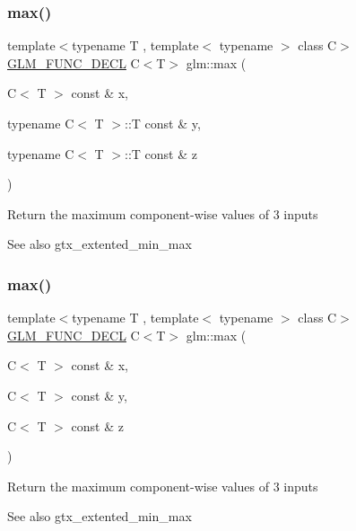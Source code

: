 \subsubsection{\texorpdfstring{max()}{max()}\hspace{0.1cm}{\footnotesize\ttfamily [2/6]}}
{\footnotesize\ttfamily template$<$typename T , template$<$ typename $>$ class C$>$ \\
\hyperlink{setup_8hpp_ab2d052de21a70539923e9bcbf6e83a51}{G\+L\+M\+\_\+\+F\+U\+N\+C\+\_\+\+D\+E\+CL} C$<$T$>$ glm\+::max (\begin{DoxyParamCaption}\item[{C$<$ T $>$ const \&}]{x,  }\item[{typename C$<$ T $>$\+::T const \&}]{y,  }\item[{typename C$<$ T $>$\+::T const \&}]{z }\end{DoxyParamCaption})}

Return the maximum component-\/wise values of 3 inputs \begin{DoxySeeAlso}{See also}
gtx\+\_\+extented\+\_\+min\+\_\+max 
\end{DoxySeeAlso}
\mbox{\label{group__gtx__extended__min__max_gaf832e9d4ab4826b2dda2fda25935a3a4}} 
\subsubsection{\texorpdfstring{max()}{max()}\hspace{0.1cm}{\footnotesize\ttfamily [3/6]}}
{\footnotesize\ttfamily template$<$typename T , template$<$ typename $>$ class C$>$ \\
\hyperlink{setup_8hpp_ab2d052de21a70539923e9bcbf6e83a51}{G\+L\+M\+\_\+\+F\+U\+N\+C\+\_\+\+D\+E\+CL} C$<$T$>$ glm\+::max (\begin{DoxyParamCaption}\item[{C$<$ T $>$ const \&}]{x,  }\item[{C$<$ T $>$ const \&}]{y,  }\item[{C$<$ T $>$ const \&}]{z }\end{DoxyParamCaption})}

Return the maximum component-\/wise values of 3 inputs \begin{DoxySeeAlso}{See also}
gtx\+\_\+extented\+\_\+min\+\_\+max 
\end{DoxySeeAlso}
\mbox{\label{group__gtx__extended__min__max_ga78e04a0cef1c4863fcae1a2130500d87}} 
